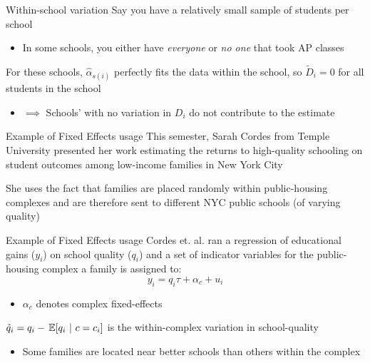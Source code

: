 \documentclass[aspectratio=169,t,11pt,table]{beamer}
\begin{document}
\begin{frame}{Within-school variation}
  Say you have a relatively small sample of students per school
  \begin{itemize}
    \item In some schools, you either have \emph{everyone} or \emph{no one} that took AP classes
  \end{itemize}  

  \pause
  \bigskip
  For these schools, $\hat{\alpha}_{s(i)}$ perfectly fits the data within the school, so $\tilde{D}_i = 0$ for all students in the school

  \pause
  \begin{itemize}
    \item[] $\implies$ Schools' with no variation in $D_i$ do not contribute to the estimate
  \end{itemize}
\end{frame}

\begin{frame}{Example of Fixed Effects usage}
  This semester, Sarah Cordes from Temple University presented her work estimating the returns to high-quality schooling on student outcomes among low-income families in New York City

  \bigskip
  She uses the fact that families are placed randomly within public-housing complexes and are therefore sent to different NYC public schools (of varying quality)
\end{frame}

\begin{frame}{Example of Fixed Effects usage}
  Cordes et. al. ran a regression of educational gains ($y_i$) on school quality ($q_i$) and a set of indicator variables for the public-housing complex a family is assigned to:
  $$
    y_i = q_i \tau + \alpha_c + u_i
  $$

  \begin{itemize}
    \item $\alpha_c$ denotes complex fixed-effects
  \end{itemize}  

  \pause
  \bigskip 
  $\tilde{q}_i = q_i - \expec{q_i}{c = c_i}$ is the within-complex variation in school-quality
  \begin{itemize}
    \item Some families are located near better schools than others within the complex
  \end{itemize}
\end{frame}
\end{document}
